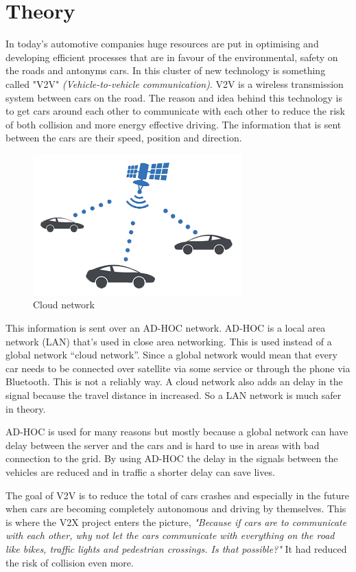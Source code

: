 \section{Theory}

In today's automotive companies huge resources are put in optimising and developing efficient processes that are in favour of the environmental, safety on the roads and antonyms cars. In this cluster of new technology is something called "V2V" \textit{(Vehicle-to-vehicle communication)}. V2V is a wireless transmission system between cars on the road. The reason and idea behind this technology is to get cars around each other to communicate with each other to reduce the risk of both collision and more energy effective driving. The information that is sent between the cars are their speed, position and direction.

\begin{figure}[H]
    \centering
    \includegraphics{images/V2VGlobal.png}
    \caption{Cloud network}
\end{figure}

This information is sent over an AD-HOC network. AD-HOC is a local area network (LAN) that's used in close area networking. This is used instead of a global network “cloud network”. Since a global network would mean that every car needs to be connected over satellite via some service or through the phone via Bluetooth. This is not a reliably way. A cloud network also adds an delay in the signal because the travel distance in increased. So a LAN network is much safer in theory. \bigskip

AD-HOC is used for many reasons but mostly because a global network can have delay between the server and the cars and is hard to use in areas with bad connection to the grid. By using AD-HOC the delay in the signals between the vehicles are reduced and in traffic a shorter delay can save lives.
\bigskip

The goal of V2V is to reduce the total of cars crashes and especially in the future when cars are becoming completely autonomous and driving by themselves. This is where the V2X project enters the picture, \textit{"Because if cars are to communicate with each other, why not let the cars communicate with everything on the road like bikes, traffic lights and pedestrian crossings. Is that possible?"} It had reduced the risk of collision even more.
\bigskip

